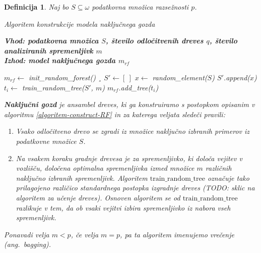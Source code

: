 \documentclass[12pt,a4paper]{article}
\newtheorem{definicija}{Definicija}
\begin{document}
\begin{definicija}
Naj bo $S \subseteq \omega$ podatkovna množica razsežnosti $p$. 
\begin{algorithm}[ht]
	\caption{Algoritem konstrukcije modela naključnega gozda}
	\label{algoritem-construct-RF}
	\raggedright
	\textbf{Vhod: podatkovna množica $S$, število odločitvenih dreves $q$, število analiziranih spremenljivk $m$}  \\
	\textbf{Izhod: model naključnega gozda $m_{rf}$} 
	\begin{algorithmic}[1]
	  \State $m_{rf} \gets $ init\_random\_forest()
  ¸	\State $S' \gets [\ ]$
		  \State $x \gets$ random\_element($S$)
		  \State $S'$.append($x$)
	  \EndFor
	  \State $t_i \gets $ train\_random\_tree($S'$, $m$)
	  \State $m_{rf}$.add\_tree($t_i$)
	  \EndFor
	\end{algorithmic}
\end{algorithm}

\textbf{Naključni gozd} je ansambel dreves, ki ga konstruiramo s postopkom opisanim v algoritmu \ref{algoritem-construct-RF} in za katerega veljata sledeči pravili:

\begin{enumerate}
\item Vsako odločitveno drevo se zgradi iz množice naključno izbranih primerov iz podatkovne množice $S$.

\item Na vsakem koraku gradnje drevesa je za spremenljivko, ki določa vejitev v vozlišču, določena optimalna spremenljivka izmed množice $m$ različnih naključno izbranih spremenljivk. Algoritem $\mathrm{train\_random\_tree}$ označuje tako prilagojeno različico standardnega postopka izgradnje dreves (TODO: sklic na algoritem za učenje dreves). Osnoven algoritem se od $\mathrm{train\_random\_tree}$ razlikuje v tem, da ob vsaki vejitvi izbira spremenljivko iz nabora vseh spremenljivk.
\end{enumerate}

Ponavadi velja $m < p$, če velja $m=p$, pa ta algoritem imenujemo vrečenje (ang.~bagging).
\end{definicija}

\end{document}
